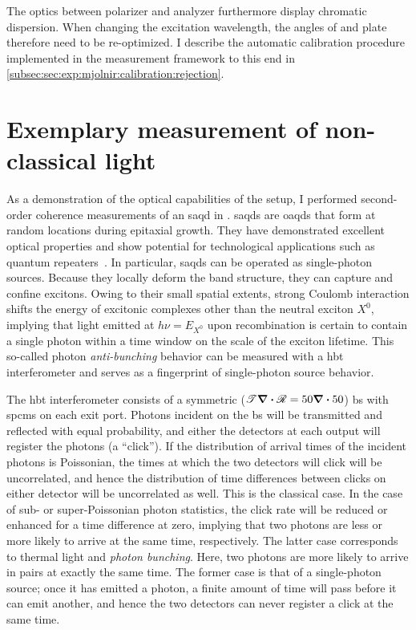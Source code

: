 The optics between polarizer and analyzer furthermore display chromatic dispersion.
When changing the excitation wavelength, the angles of \halfwave and \quarterwave plate therefore need to be re-optimized.
I describe the automatic calibration procedure implemented in the measurement framework to this end in \cref{subsec:sec:exp:mjolnir:calibration:rejection}.

\section{Exemplary measurement of non-classical light}\label{sec:setup:optics:g2}
As a demonstration of the optical capabilities of the setup, I performed second-order coherence measurements of an  \gls{saqd} in .
\Glspl{saqd} are \glspl{oaqd} that form at random locations during epitaxial growth.
They have demonstrated excellent optical properties and show potential for technological applications such as quantum repeaters~\cite{Petroff2001,Warburton2013,Lodahl2015,Zajac2025}.
In particular, \glspl{saqd} can be operated as single-photon sources.
Because they locally deform the band structure, they can capture and confine excitons.
Owing to their small spatial extents, strong Coulomb interaction shifts the energy of excitonic complexes other than the neutral exciton $X^{0}$, implying that light emitted at $h\nu = E_{X^{0}}$ upon recombination is certain to contain a single photon within a time window on the scale of the exciton lifetime.
This so-called photon \emph{anti-bunching} behavior
can be measured with a \gls{hbt} interferometer and serves as a fingerprint of single-photon source behavior.

The \gls{hbt} interferometer consists of a symmetric ($\mathscr{T}\div\mathscr{R}=\num{50}\div\num{50}$) \acrlong{bs} with \glspl{spcm} on each exit port.
Photons incident on the \gls{bs} will be transmitted and reflected with equal probability, and either the detectors at each output will register the photons (a \enquote{click}).
If the distribution of arrival times of the incident photons is Poissonian, the times at which the two detectors will click will be uncorrelated, and hence the distribution of time differences between clicks on either detector will be uncorrelated as well.
This is the classical case.
In the case of sub- or super-Poissonian photon statistics, the click rate will be reduced or enhanced for a time difference at zero, implying that two photons are less or more likely to arrive at the same time, respectively.
The latter case corresponds to thermal light and \emph{photon bunching}.
Here, two photons are more likely to arrive in pairs at exactly the same time.
The former case is that of a single-photon source; once it has emitted a photon, a finite amount of time will pass before it can emit another, and hence the two detectors can never register a click at the same time.

